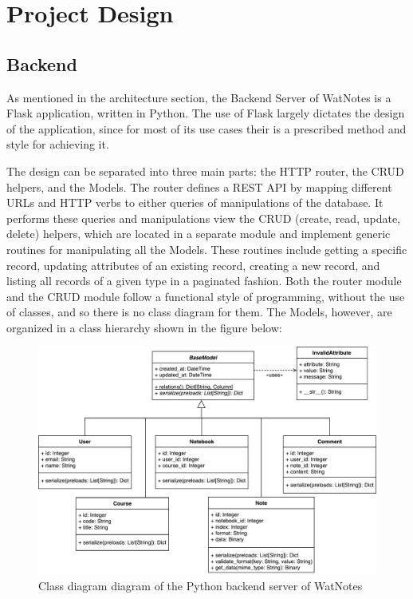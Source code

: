 \documentclass[12pt]{article}
\begin{document}
  \newpage

  \section{Project Design}
  \subsection{Backend}
    As mentioned in the architecture section, the Backend Server of WatNotes is
    a Flask application, written in Python. The use of Flask largely dictates
    the design of the application, since for most of its use cases their is a
    prescribed method and style for achieving it.

    The design can be separated into three main parts: the HTTP router, the CRUD
    helpers, and the Models. The router defines a REST API by mapping different
    URLs and HTTP verbs to either queries of manipulations of the database. It
    performs these queries and manipulations view the CRUD (create, read,
    update, delete) helpers, which are located in a separate module and
    implement generic routines for manipulating all the Models. These routines
    include getting a specific record, updating attributes of an existing
    record, creating a new record, and listing all records of a given type in a
    paginated fashion. Both the router module and the CRUD module follow a
    functional style of programming, without the use of classes, and so there is
    no class diagram for them. The Models, however, are organized in a class
    hierarchy shown in the figure below:

    \begin{figure}[H]
      \includegraphics[width=\textwidth]{assets/backend-class.pdf}
      \caption{Class diagram diagram of the Python backend server of WatNotes}
    \end{figure}
\end{document}
